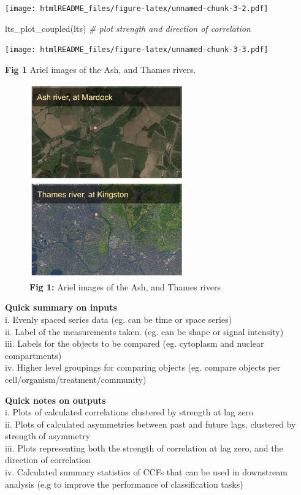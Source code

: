 \documentclass[
]{article}
\newenvironment{Shaded}{\begin{snugshade}}{\end{snugshade}}
\newcommand{\CommentTok}[1]{\textcolor[rgb]{0.56,0.35,0.01}{\textit{#1}}}
\newcommand{\FunctionTok}[1]{\textcolor[rgb]{0.00,0.00,0.00}{#1}}
\newcommand{\NormalTok}[1]{#1}
\begin{document}
\texttt{[image: htmlREADME\_files/figure-latex/unnamed-chunk-3-2.pdf]}

\begin{Shaded}
\begin{Highlighting}[]
\FunctionTok{lts\_plot\_coupled}\NormalTok{(lts) }\CommentTok{\# plot strength and direction of correlation}
\end{Highlighting}
\end{Shaded}

\texttt{[image: htmlREADME\_files/figure-latex/unnamed-chunk-3-3.pdf]}

\textbf{Fig 1} Ariel images of the Ash, and Thames rivers.

\begin{figure}
\centering
\includegraphics[width=0.6\textwidth,height=\textheight]{man/figures/riverCatchments.png}
\caption{\textbf{Fig 1:} Ariel images of the Ash, and Thames rivers}
\end{figure}

\textbf{Quick summary on inputs}\\
i. Evenly spaced series data (eg. can be time or space series)\\
ii. Label of the measurements taken. (eg. can be shape or signal
intensity)\\
iii. Labels for the objects to be compared (eg. cytoplasm and nuclear
compartments)\\
iv. Higher level groupings for comparing objects (eg. compare objects
per cell/organism/treatment/community)

\textbf{Quick notes on outputs}\\
i. Plots of calculated correlations clustered by strength at lag zero\\
ii. Plots of calculated asymmetries between past and future lags,
clustered by strength of asymmetry\\
iii. Plots representing both the strength of correlation at lag zero,
and the direction of correlation\\
iv. Calculated summary statistics of CCFs that can be used in downstream
analysis (e.g to improve the performance of classification tasks)
\end{document}
